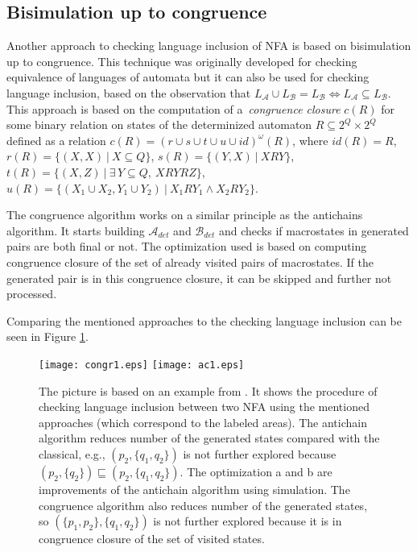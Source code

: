 \documentclass{eeict}
\begin{document}
\subsection{Bisimulation up to congruence}
Another approach to checking language inclusion of NFA is based on bisimulation up to congruence. This technique was originally developed for
checking equivalence of languages of automata but it can
also be used for checking language inclusion, based on the observation that $L_\mathcal{A}\cup L_\mathcal{B}= L_\mathcal{B} 
\Leftrightarrow L_\mathcal{A}\subseteq L_\mathcal{B}$. 
This approach is based on the computation of a~\emph{congruence closure} $c(R)$ 
for some binary relation on states of the determinized automaton $R \subseteq 2^Q\times 2^Q$ defined 
as a relation $c(R)=(r\cup s\cup t \cup u\cup id)^{\omega}(R)$, where $id(R)=R$, 
$r(R)=\{(X,X)\ |\ X\subseteq Q\}$, 
$s(R)=\{(Y,X)\ |\ XRY\}$,\linebreak
$t(R)=\{(X,Z)\ |\ \exists\,Y\subseteq Q,\ XRYRZ\}$,
$u(R)=\{(X_1 \cup X_2,Y_1\cup Y_2)\ |\ X_1 R Y_1 \wedge X_2 R Y_2\}$. 

The congruence algorithm works on a similar principle as the antichains algorithm. 
It starts building $\mathcal{A}_{det}$ and $\mathcal{B}_{det}$ and checks if macrostates in generated pairs are both
final or not. The optimization used is based on computing congruence closure of the set of already visited pairs of macrostates. 
If the generated pair is in this congruence closure, it can be skipped and further not processed.

Comparing the mentioned approaches to the checking language inclusion can be seen in Figure \ref{automata}.
\begin{figure}[bht]
\begin{center}
	\scalebox{1}
	{
		\texttt{[image: congr1.eps]}
		\hspace{0.55cm}
  	\texttt{[image: ac1.eps]}
	}
  \caption{
      \rm{
      \hspace{0.1cm} The picture is based on an example from \cite{tacas10}.
      It shows the procedure of checking language inclusion between two NFA using the mentioned approaches (which correspond to the labeled areas).
      The antichain algorithm reduces number of the generated states compared with the classical,
      e.g., $(p_2,\{q_1,q_2\})$ is not further explored because $(p_2,\{q_2\}) \sqsubseteq (p_2,\{q_1,q_2\})$. 
      The optimization a and b are improvements of the antichain algorithm using simulation. 
      The congruence algorithm also reduces number of the generated states, so $(\{p_1,p_2\},\{q_1,q_2\})$ 
      is not further explored because it is in congruence closure 
      of the set of visited states.}}
  \label{automata}
\end{center}
\end{figure}
\end{document}
